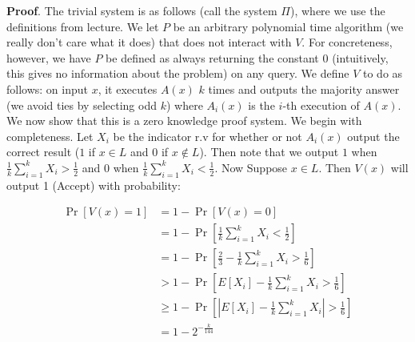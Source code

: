\documentclass{article}
\begin{document}
\begin{enumerate}[,start=3]
\begin{mdbmarginx}{1ex}{0pt}{1ex}{0pt}%
\noindent{}\textbf{Proof}.  The trivial system is as follows (call the system $\Pi$), where we use the definitions from lecture. We let $P$ be an
arbitrary polynomial time algorithm (we really don't care what it does) that does not interact
with $V$. For concreteness, however, we have $P$ be defined as always returning the constant $0$ 
(intuitively, this gives no information about the problem) on any query. We define $V$
to do as follows: on input $x$, it executes $A(x)$ $k$ times and outputs the majority answer (we
avoid ties by selecting odd $k$) where
$A_i(x)$ is the $i$-th execution of $A(x)$. We now show that this is a zero knowledge proof system.
We begin with completeness. Let $X_i$ be the indicator r.v for whether or not $A_i(x)$ output the 
correct result ($1$ if $x \in L$ and $0$ if $x \notin L$). Then note that we output $1$
when $\frac{1}{k}\sum_{i=1}^k X_i > \frac{1}{2}$ and $0$ when $\frac{1}{k} \sum_{i=1}^k X_i < \frac{1}{2}$.
Now Suppose $x \in L$. 
Then $V(x)$ will output 1 (Accept) with probability:%
\end{mdbmarginx}%
\noindent\noindent\[%
\begin{aligned}
\Pr[V(x) = 1] &= 1 - \Pr[V(x) = 0] \\
&= 1 - \Pr[\frac{1}{k} \sum_{i=1}^k X_i < \frac{1}{2}] \\
&= 1 - \Pr[\frac{2}{3} - \frac{1}{k} \sum_{i=1}^k X_i > \frac{1}{6}] \\
&> 1 - \Pr[E[X_i] - \frac{1}{k} \sum_{i=1}^k X_i > \frac{1}{6}] \\
&\geq 1 - \Pr[|E[X_i] - \frac{1}{k} \sum_{i=1}^k X_i| > \frac{1}{6}]  \\
&= 1 - 2^{-\frac{k}{144}}
\end{aligned}
\]%


\end{enumerate}
\end{document}
